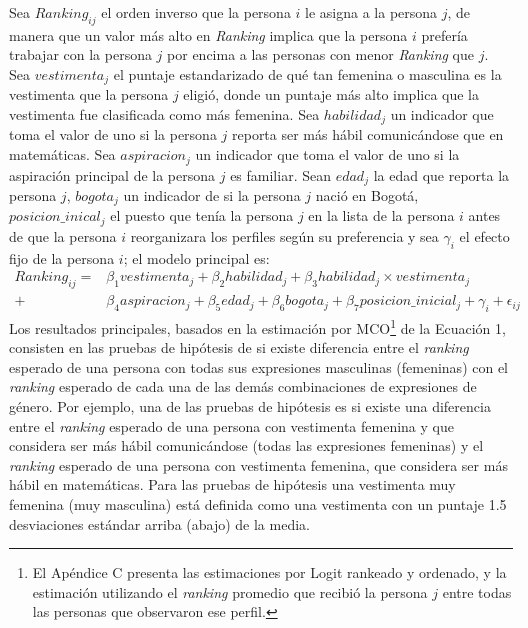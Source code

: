 Sea $Ranking_{ij}$ el orden inverso que la persona $i$ le asigna a la persona $j$, de manera que un valor más alto en \textit{Ranking} implica que la persona $i$ prefería trabajar con la persona $j$ por encima a las personas con menor \textit{Ranking} que $j$. Sea $vestimenta_j$ el puntaje estandarizado de qué tan femenina o masculina es la vestimenta que la persona $j$ eligió, donde un puntaje más alto implica que la vestimenta fue clasificada como más femenina. Sea $habilidad_j$ un indicador que toma el valor de uno si la  persona $j$ reporta ser más hábil comunicándose que en matemáticas. Sea $aspiracion_j$ un indicador que toma el valor de uno si la aspiración principal de la persona $j$ es familiar. Sean $edad_j$ la edad que reporta la persona $j$, $bogota_j$ un indicador de si la persona $j$ nació en Bogotá, $posicion\_inical_j$ el puesto que tenía la persona $j$ en la lista de la persona $i$ antes de que la persona $i$ reorganizara los perfiles según su preferencia y sea $\gamma_i$ el efecto fijo de la persona $i$; el modelo principal es: 
\begin{equation}
    \begin{split}
	Ranking_{ij}=& \beta_1vestimenta_j +  \beta_2habilidad_j + \beta_3habilidad_j\times vestimenta_{j} \\
	+ & \beta_4aspiracion_j + \beta_5edad_j + \beta_6bogota_j + \beta_7posicion\_inicial_j+\gamma_i + \epsilon_{ij}
	\end{split}
\end{equation}
Los resultados principales, basados en la estimación por MCO\footnote{El Apéndice C presenta las estimaciones por Logit rankeado y ordenado, y la estimación utilizando el \textit{ranking} promedio que recibió la persona $j$ entre todas las personas que observaron ese perfil.} de la Ecuación 1, consisten en las pruebas de hipótesis de si existe diferencia entre el \textit{ranking} esperado de una persona con todas sus expresiones masculinas (femeninas) con el \textit{ranking} esperado de cada una de las demás combinaciones de expresiones de género. Por ejemplo, una de las pruebas de hipótesis es si existe una diferencia entre el \textit{ranking} esperado de una persona con vestimenta femenina y que considera ser más hábil comunicándose (todas las expresiones femeninas) y el \textit{ranking} esperado de una persona con vestimenta femenina, que considera ser más hábil en matemáticas. Para las pruebas de hipótesis una vestimenta muy femenina (muy masculina) está definida como una vestimenta con un puntaje 1.5 desviaciones estándar arriba (abajo) de la media.

